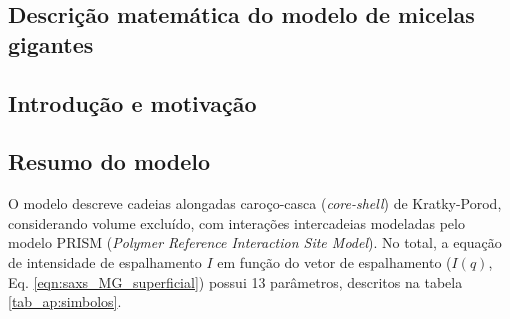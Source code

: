 
\begin{apendicesenv}
	\partapendices
	
	\chapter{Descrição matemática do modelo de micelas gigantes}
	
	\section{Introdução e motivação}
%	
%	
%	
	
	\section{Resumo do modelo}
	
	O modelo descreve cadeias alongadas caroço-casca (\emph{core-shell}) de Kratky-Porod, considerando volume excluído, com interações intercadeias modeladas pelo modelo PRISM (\emph{Polymer Reference Interaction Site Model}). No total, a equação de intensidade de espalhamento $I$ em função do vetor de espalhamento \q ($I(q)$, Eq. \ref{eqn:saxs_MG_superficial}) possui 13 parâmetros, descritos na tabela \ref{tab_ap:simbolos}.
	

\end{apendicesenv}
